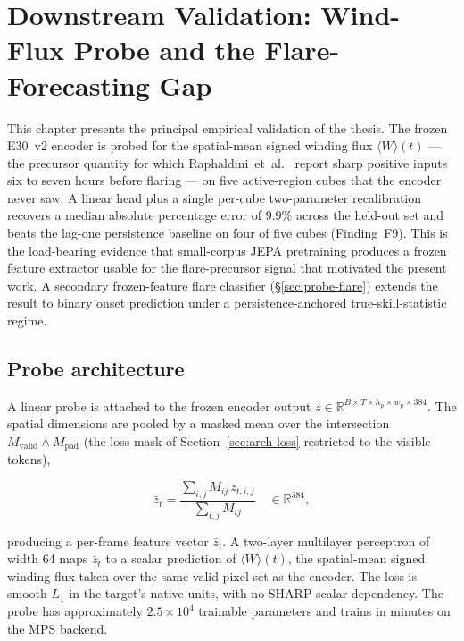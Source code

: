 \chapter{Downstream Validation: Wind-Flux Probe and the Flare-Forecasting Gap}
\label{ch:probe}

This chapter presents the principal empirical validation of the
thesis. The frozen E30~v2 encoder is probed for the spatial-mean
signed winding flux $\langle W \rangle(t)$ --- the precursor
quantity for which Raphaldini~et~al.~\cite{raphaldini2022winding}
report sharp positive inputs six to seven hours before flaring ---
on five active-region cubes that the encoder never saw. A linear
head plus a single per-cube two-parameter recalibration recovers a
median absolute percentage error of $9.9\%$ across the held-out
set and beats the lag-one persistence baseline on four of five
cubes (Finding~F9). This is the load-bearing evidence that
small-corpus JEPA pretraining produces a frozen feature extractor
usable for the flare-precursor signal that motivated the present
work. A secondary frozen-feature flare classifier
(\S\ref{sec:probe-flare}) extends the result to binary onset
prediction under a persistence-anchored true-skill-statistic
regime.

\section{Probe architecture}
\label{sec:probe-arch}

A linear probe is attached to the frozen encoder output $z \in
\mathbb{R}^{B \times T \times h_{p} \times w_{p} \times 384}$. The
spatial dimensions are pooled by a masked mean over the intersection
$M_{\text{valid}} \land M_{\text{pad}}$ (the loss mask of
Section~\ref{sec:arch-loss} restricted to the visible tokens),

\begin{equation}
\bar{z}_{t} = \frac{\sum_{i,j} M_{ij} \, z_{t,i,j}}
                   {\sum_{i,j} M_{ij}}
              \quad \in \mathbb{R}^{384},
\end{equation}

producing a per-frame feature vector $\bar{z}_{t}$. A two-layer
multilayer perceptron of width 64 maps $\bar{z}_{t}$ to a scalar
prediction of $\langle W \rangle (t)$, the spatial-mean signed
winding flux taken over the same valid-pixel set as the encoder. The
loss is smooth-$L_{1}$ in the target's native units, with no
SHARP-scalar dependency. The probe has approximately
$2.5 \times 10^{4}$ trainable parameters and trains in minutes on
the MPS backend.

